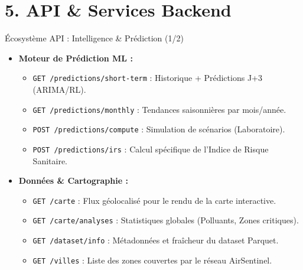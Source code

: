 \documentclass[10pt, aspectratio=169]{beamer}
\begin{document}
\section{5. API \& Services Backend}
\begin{frame}[fragile]{Écosystème API : Intelligence \& Prédiction (1/2)}
  \begin{itemize}
    \item \textbf{Moteur de Prédiction ML :}
    \begin{itemize}
      \item \texttt{GET /predictions/short-term} : Historique + Prédictions J+3 (ARIMA/RL).
      \item \texttt{GET /predictions/monthly} : Tendances saisonnières par mois/année.
      \item \texttt{POST /predictions/compute} : Simulation de scénarios (Laboratoire).
      \item \texttt{POST /predictions/irs} : Calcul spécifique de l'Indice de Risque Sanitaire.
    \end{itemize}
    \item \textbf{Données \& Cartographie :}
    \begin{itemize}
      \item \texttt{GET /carte} : Flux géolocalisé pour le rendu de la carte interactive.
      \item \texttt{GET /carte/analyses} : Statistiques globales (Polluants, Zones critiques).
      \item \texttt{GET /dataset/info} : Métadonnées et fraîcheur du dataset Parquet.
      \item \texttt{GET /villes} : Liste des zones couvertes par le réseau AirSentinel.
    \end{itemize}
  \end{itemize}
\end{frame}
\end{document}
